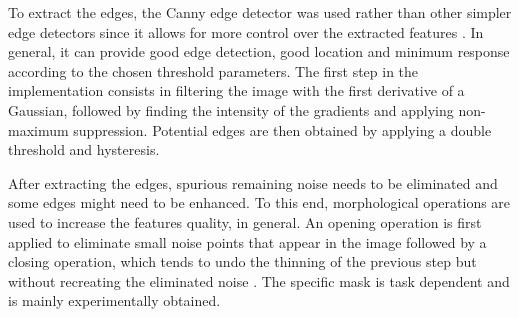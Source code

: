 \documentclass[conference]{IEEEtran}
\begin{document}
To extract the edges, the Canny edge detector was used rather than other simpler edge detectors since it allows for more control over the extracted features \cite{bao2005canny} \cite{gonzalez2004digital1}. In general, it can provide good edge detection, good location and minimum response according to the chosen threshold parameters. The first step in the implementation consists in filtering the image with the first derivative of a Gaussian, followed by finding the intensity of the gradients and applying non-maximum suppression. Potential edges are then obtained by applying a double threshold and hysteresis.

After extracting the edges, spurious remaining noise needs to be eliminated and some edges might need to be enhanced. To this end, morphological operations are used to increase the features quality, in general. An opening operation is first applied to eliminate small noise points that appear in the image followed by a closing operation, which tends to undo the thinning of the previous step but without recreating the eliminated noise \cite{lybanon1994segmentation}\cite{gonzalez2004digital2}. The specific mask is task dependent and is mainly experimentally obtained.
\end{document}
